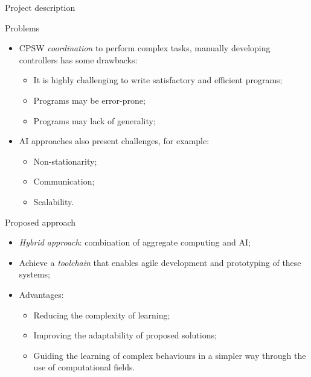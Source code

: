 \documentclass[presentation]{beamer}\mode<presentation>{\usetheme{AMSBolognaFC}}
\begin{document}
\begin{frame}[allowframebreaks]{Project description}

\begin{block}{Problems}
	\begin{itemize}
		\item CPSW \emph{coordination} to perform complex tasks, manually developing controllers 
			has some drawbacks:
		\begin{itemize}
			\item It is highly challenging to write satisfactory and efficient programs;
			\item Programs may be error-prone;
			\item Programs may lack of generality;
		\end{itemize}
		\item AI approaches also present challenges, for example:
		\begin{itemize}
			\item Non-stationarity;
			\item Communication;
			\item Scalability.
		\end{itemize}
	\end{itemize}
\end{block}
	
\begin{alertblock}{Proposed approach}
	\begin{itemize}
		\item \emph{Hybrid approach}: combination of aggregate computing and AI;
		\item Achieve a \emph{toolchain} that enables agile development and prototyping of these systems;
		\item Advantages:
		\begin{itemize}
			\item Reducing the complexity of learning;
			\item Improving the adaptability of proposed solutions;
			\item Guiding the learning of complex behaviours in a simpler way through the use of 
				computational fields.
		\end{itemize}
	\end{itemize}
\end{alertblock}

\end{frame}
\end{document}
